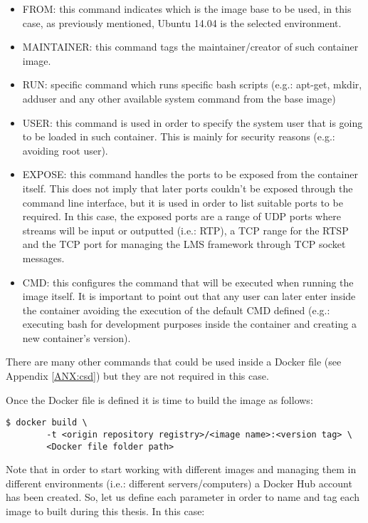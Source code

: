 \begin{itemize}
\item FROM: this command indicates which is the image base to be used, in this case, as previously mentioned, Ubuntu 14.04 is the selected environment.
\item MAINTAINER: this command tags the maintainer/creator of such container image.
\item RUN: specific command which runs specific bash scripts (e.g.: apt-get, mkdir, adduser and any other available system command from the base image)
\item USER: this command is used in order to specify the system user that is going to be loaded in such container. This is mainly for security reasons (e.g.: avoiding root user).
\item EXPOSE: this command handles the ports to be exposed from the container itself. This does not imply that later ports couldn't be exposed through the command line interface, but it is used in order to list suitable ports to be required. In this case, the exposed ports are a range of UDP ports where streams will be input or outputted (i.e.: RTP), a TCP range for the RTSP and the TCP port for managing the LMS framework through TCP socket messages. 
\item CMD: this configures the command that will be executed when running the image itself. It is important to point out that any user can later enter inside the container avoiding the execution of the default CMD defined (e.g.: executing bash for development purposes inside the container and creating a new container's version).
\end{itemize}

There are many other commands that could be used inside a Docker file (see Appendix \ref{ANX:csd}) but they are not required in this case.

Once the Docker file is defined it is time to build the image as follows:

\begin{verbatim}
$ docker build \
		-t <origin repository registry>/<image name>:<version tag> \
		<Docker file folder path>
\end{verbatim}

Note that in order to start working with different images and managing them in different environments (i.e.: different servers/computers) a Docker Hub account has been created. So, let us define each parameter in order to name and tag each image to built during this thesis. In this case:


